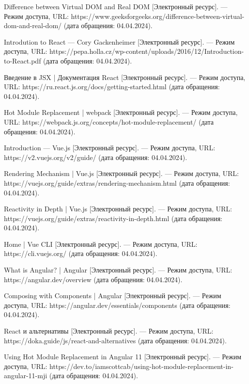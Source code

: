 \begin{thebibliography}{}
	Difference between Virtual DOM and Real DOM [Электронный ресурс]. --- Режим доступа, URL: https://www.geeksforgeeks.org/difference-between-virtual-dom-and-real-dom/ (дата обращения: 04.04.2024).
	
	Introdution to React --- Cory Gackenheimer [Электронный ресурс]. --- Режим доступа, URL: https://pepa.holla.cz/wp-content/uploads/2016/12/Introduction-to-React.pdf (дата обращения: 04.04.2024).
	
	Введение в JSX | Документация React [Электронный ресурс]. --- Режим доступа, URL: https://ru.react.js.org/docs/getting-started.html (дата обращения: 04.04.2024).
	
	Hot Module Replacement | webpack [Электронный ресурс]. --- Режим доступа, URL: https://webpack.js.org/concepts/hot-module-replacement/ (дата обращения: 04.04.2024).
	
	Introduction --- Vue.js [Электронный ресурс]. --- Режим доступа, URL: https://v2.vuejs.org/v2/guide/ (дата обращения: 04.04.2024).
	
	Rendering Mechanism | Vue.js [Электронный ресурс]. --- Режим доступа, URL:  https://vuejs.org/guide/extras/rendering-mechanism.html (дата обращения: 04.04.2024).
	
	Reactivity in Depth | Vue.js [Электронный ресурс]. --- Режим доступа, URL: https://vuejs.org/guide/extras/reactivity-in-depth.html (дата обращения: 04.04.2024).

	Home  | Vue CLI [Электронный ресурс]. --- Режим доступа, URL: https://cli.vuejs.org/ (дата обращения: 04.04.2024).
	
	What is Angular? | Angular [Электронный ресурс]. --- Режим доступа, URL: https://angular.dev/overview (дата обращения: 04.04.2024).
	
	Composing with Components | Angular [Электронный ресурс]. --- Режим доступа, URL:  https://angular.dev/essentials/components (дата обращения: 04.04.2024).

	React и альтернативы [Электронный ресурс]. --- Режим доступа, URL:  https://doka.guide/js/react-and-alternatives (дата обращения: 04.04.2024).
	
	Using Hot Module Replacement in Angular 11 [Электронный ресурс]. --- Режим доступа, URL:  https://dev.to/iamscottcab/using-hot-module-replacement-in-angular-11-mji (дата обращения: 04.04.2024).
	

\end{thebibliography}
